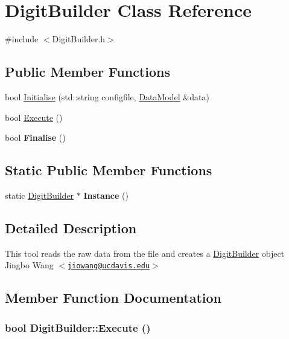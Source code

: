 \hypertarget{classDigitBuilder}{
\section{DigitBuilder Class Reference}
\label{classDigitBuilder}
}


{\ttfamily \#include $<$DigitBuilder.h$>$}\subsection*{Public Member Functions}
\begin{DoxyCompactItemize}
\item 
bool \hyperlink{classDigitBuilder_aacb1cb36e5063ba4774381012ac148d6}{Initialise} (std::string configfile, \hyperlink{classDataModel}{DataModel} \&data)
\item 
bool \hyperlink{classDigitBuilder_a77c2d2d5208563e7a9d8f1a2c8a4777c}{Execute} ()
\item 
\hypertarget{classDigitBuilder_adfbdd3e33b7ac69a7be4bf54fd264066}{
bool {\bfseries Finalise} ()}
\label{classDigitBuilder_adfbdd3e33b7ac69a7be4bf54fd264066}

\end{DoxyCompactItemize}
\subsection*{Static Public Member Functions}
\begin{DoxyCompactItemize}
\item 
\hypertarget{classDigitBuilder_a3bffe9fa6444a64595122c859d00513d}{
static \hyperlink{classDigitBuilder}{DigitBuilder} $\ast$ {\bfseries Instance} ()}
\label{classDigitBuilder_a3bffe9fa6444a64595122c859d00513d}

\end{DoxyCompactItemize}


\subsection{Detailed Description}
This tool reads the raw data from the file and creates a \hyperlink{classDigitBuilder}{DigitBuilder} object Jingbo Wang $<$\href{mailto:jiowang@ucdavis.edu}{\tt jiowang@ucdavis.edu}$>$ 

\subsection{Member Function Documentation}
\hypertarget{classDigitBuilder_a77c2d2d5208563e7a9d8f1a2c8a4777c}{
\subsubsection[{Execute}]{\setlength{\rightskip}{0pt plus 5cm}bool DigitBuilder::Execute ()}}
\label{classDigitBuilder_a77c2d2d5208563e7a9d8f1a2c8a4777c}


